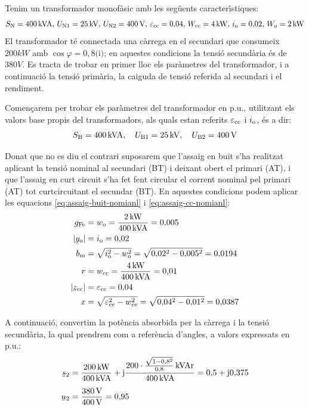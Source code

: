 \begin{exemple}
    Tenim un transformador monof\`{a}sic amb les seg\"{u}ents caracter\'{\i}stiques:
    \[S_\mathrm{N}=400\mathrm{\,kVA},\,U_\mathrm{N1}=25\mathrm{\,kV},\, U_\mathrm{N2}=400\mathrm{\,V},\, \varepsilon_\mathrm{cc}=0{,}04,\, W_\mathrm{cc}=4\mathrm{\,kW},\, i_\mathrm{o}=0{,}02,\,  W_\mathrm{o}=2\mathrm{\,kW}\]
     El transformador t\'{e} connectada una c\`{a}rrega en el secundari que consumeix $200\unit{kW}$ amb $\cos{\varphi}=0{,}8\text{(i)}$; en aquestes condicions la tensi\'{o} secund\`{a}ria \'{e}s de $380\unit{V}$.
    Es tracta de trobar en primer lloc els par\`{a}metres del transformador, i a continuaci\'{o} la tensi\'{o} prim\`{a}ria, la caiguda de tensi\'{o} referida al secundari i el rendiment.

    Comen\c{c}arem per trobar els par\`{a}metres del transformador en p.u., utilitzant els valors base propis del transformadors, als quals estan referits $\varepsilon_\mathrm{cc}$ i $i_\mathrm{o}$, \'{e}s a dir:
    \[ S_\mathrm{B}=400\mathrm{\,kVA},\quad U_\mathrm{B1}=25\mathrm{\,kV},\quad U_\mathrm{B2}=400\mathrm{\,V}\]

    Donat que no es diu el contrari suposarem que l'assaig en buit s'ha realitzat aplicant la tensi\'{o} nominal al secundari (BT) i deixant obert el primari (AT), i que l'assaig en curt circuit s'ha fet fent circular el corrent nominal pel primari (AT) tot curtcircuitant el secundar (BT). En aquestes condicions podem aplicar les equacions \eqref{eq:assaig-buit-nomianl} i \eqref{eq:assaig-cc-nomianl}:
   \begin{align*}
        g\ped{Fe} &= w\ped{o} = \frac{2\unit{kW}}{400\unit{kVA}} = 0{,}005 \\
        |\cmplx{y}\ped{o}| &= i\ped{o}  = 0{,}02 \\
        b\ped{m} &= \sqrt{i\ped{o}^2 - w\ped{o}^2} = \sqrt{0{,}02^2 - 0{,}005^2} = 0{,}0194\\
        r &= w\ped{cc} = \frac{4\unit{kW}}{400\unit{kVA}} = 0{,}01 \\
        |\cmplx{z}\ped{cc}| &=  \varepsilon\ped{cc} = 0{,}04 \\
        x &= \sqrt{\varepsilon\ped{cc}^2 - w\ped{cc}^2} = \sqrt{0{,}04^2-0{,}01^2} = 0{,}0387
  \end{align*}

        A continuaci\'{o}, convertim la pot\`{e}ncia absorbida per la c\`{a}rrega i la tensi\'{o} secund\`{a}ria, la qual prendrem com a refer\`{e}ncia d'angles,  a valors expressats en p.u.:
  \begin{align*}
    \cmplx{s}_2 &= \frac{200\unit{kW}}{400\unit{kVA}} + \ju \frac{200\cdot \frac{\sqrt{1-0{,}8^2}}{0{,}8}\unit{kVAr}}{400\unit{kVA}} = 0{,}5 + \ju 0{,}375\\[1ex]
    \cmplx{u}_2 &= \frac{380\unit{V}}{400\unit{V}} = 0{,}95
  \end{align*}


\end{exemple}
